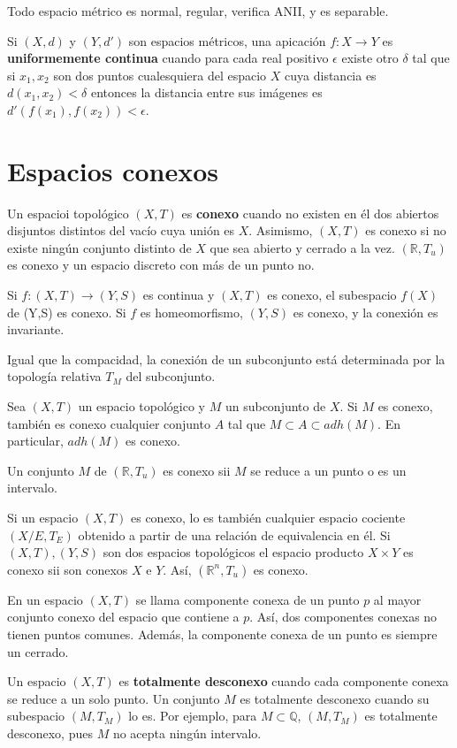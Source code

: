 \documentclass[a4paper, 11pt]{extarticle}
\begin{document}
Todo espacio métrico es normal, regular, verifica ANII, y es separable.

Si \((X,d)\) y \((Y, d')\) son espacios métricos, una apicación \(f: X
\rightarrow Y\) es \textbf{uniformemente continua} cuando para cada real positivo \(\epsilon\) existe otro \(\delta\) tal que si \(x_1, x_2\) son dos puntos
cualesquiera del espacio \(X\) cuya distancia es \(d(x_1,x_2) < \delta\)
entonces la distancia entre sus imágenes es \(d'(f(x_1), f(x_2)) < \epsilon\).

\section{Espacios conexos}
\label{sec:org9d1a736}
Un espacioi topológico \((X,T)\) es \textbf{conexo} cuando no existen en él dos abiertos
disjuntos distintos del vacío cuya unión es \(X\). Asimismo, \((X,T)\) es
conexo si no existe ningún conjunto distinto de \(X\) que sea abierto y
cerrado a la vez. \((\mathbb{R}, T_u)\) es conexo y un espacio discreto con
más de un punto no.

Si \(f:(X,T) \rightarrow (Y,S)\) es continua y \((X,T)\) es conexo, el
subespacio \(f(X)\) de (Y,S) es conexo. Si \(f\) es homeomorfismo, \((Y,S)\) es conexo, y la conexión es invariante.

Igual que la compacidad, la conexión de un subconjunto está determinada por la
topología relativa \(T_M\) del subconjunto.

Sea \((X,T)\) un espacio topológico y \(M\) un subconjunto de \(X\). Si \(M\) es conexo, también es conexo cualquier conjunto \(A\) tal que \(M
\subset A \subset adh(M)\). En particular, \(adh(M)\) es conexo.

Un conjunto \(M\) de \((\mathbb{R}, T_u)\) es conexo sii \(M\) se reduce a
un punto o es un intervalo.

Si un espacio \((X,T)\) es conexo, lo es también cualquier espacio cociente \((X/E, T_E)\) obtenido a partir de una relación de equivalencia en él.
Si \((X,T), (Y,S)\) son dos espacios topológicos el espacio producto \(X
\times Y\) es conexo sii son conexos \(X\) e \(Y\). Así, \((\mathbb{R}^n,
T_u)\) es conexo.

En un espacio \((X,T)\) se llama componente conexa de un punto \(p\) al
mayor conjunto conexo del espacio que contiene a \(p\). Así, dos componentes
conexas no tienen puntos comunes. Además, la componente conexa de un punto es
siempre un cerrado.

Un espacio \((X,T)\) es \textbf{totalmente desconexo} cuando cada componente conexa se
reduce a un solo punto. Un conjunto \(M\) es totalmente desconexo cuando su
subespacio \((M, T_M)\) lo es. Por ejemplo, para \(M \subset \mathbb{Q}\),
\((M, T_M)\) es totalmente desconexo, pues \(M\) no acepta ningún intervalo. 
\end{document}
